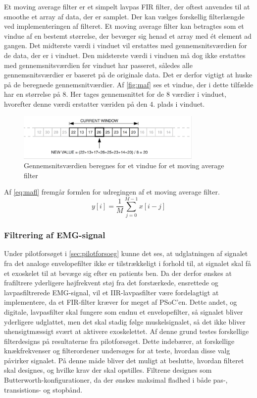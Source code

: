 \vspace{3mm}
\noindent
Et moving average filter er et simpelt lavpas FIR filter, der oftest anvendes til at smoothe et array af data, der er samplet. Der kan vælges forskellig filterlængde ved implementeringen af filteret. Et moving average filter kan betragtes som et vindue af en bestemt størrelse, der bevæger sig henad et array med ét element ad gangen. Det midterste værdi i vinduet vil erstattes med gennemsnitsværdien for de data, der er i vinduet. Den midsterste værdi i vinduen må dog ikke erstattes med gennemsnitsværdien før vinduet har passeret, således alle gennemsnitsværdier er baseret på de originale data. Det er derfor vigtigt at huske på de beregnede gennemsnitværdier. Af \autoref{fig:maf} ses et vindue, der i dette tilfælde har en størrelse på 8. Her tages gennemsnittet for de 8 værdier i vinduet, hvorefter denne værdi erstatter væriden på den 4. plads i vinduet.\citep{atmel2002}

\begin{figure} [H]
\centering
\includegraphics[width=0.8\textwidth]{figures/maf}
\caption{Gennemsnitsværdien beregnes for et vindue for et moving average filter}
\label{fig:maf}
\end{figure} 

Af \autoref{eq:mafl} fremgår formlen for udregingen af et moving average filter. 
\begin{equation}
y[i]=\dfrac{1}{M}\sum^{M-1}_{j=0} x[i-j]
\label{eq:mafl}
\end{equation}

\subsubsection{Filtrering af EMG-signal}
Under pilotforsøget i \autoref{sec:pilotforsoeg} kunne det ses, at udglatningen af signalet fra det analoge envelopefilter ikke er tilstrækkeligt i forhold til, at signalet skal få et exoskelet til at bevæge sig efter en patients ben. Da der derfor ønskes at frafiltrere yderligere højfrekvent støj fra det forstærkede, ensrettede og lavpasfiltrerede EMG-signal, vil et IIR-lavpasfilter være fordelagtigt at implementere, da et FIR-filter kræver for meget af PSoC'en. Dette andet, og digitale, lavpasfilter skal fungere som endnu et envelopefilter, så signalet bliver yderligere udglattet, men det skal stadig følge muskelsignalet, så det ikke bliver uhensigtmæssigt svært at aktivere exoskelettet.  
Af denne grund testes forskellige filterdesigns på resultaterne fra pilotforsøget. Dette indebærer, at forskellige knækfrekvenser og filterordener undersøges for at teste, hvordan disse valg påvirker signalet. På denne måde bliver det muligt at beslutte, hvordan filteret skal designes, og hvilke krav der skal opstilles. Filtrene designes som Butterworth-konfigurationer, da der ønskes maksimal fladhed i både pas-, transistions- og stopbånd. 

